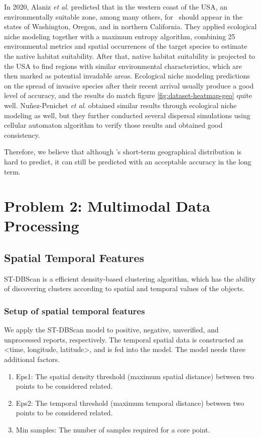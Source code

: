 \documentclass{mcmthesis}
\begin{document}
In 2020, Alaniz \emph{et al}. \cite{alaniz2021giants} predicted that in the western coast of the USA,
an environmentally suitable zone, among many others, for \VM\ should appear in the states of Washington, Oregon, and in northern California. They applied ecological niche modeling together with a maximum entropy
algorithm, combining 25 environmental metrics and spatial occurrences of the target species to estimate
the native habitat suitability. After that, native habitat suitability is projected to the USA to find regions with similar environmental characteristics, which are then marked as potential invadable areas. Ecological niche modeling predictions on the spread of invasive species after their recent arrival usually produce a good level of accuracy\cite{peterson2012species,elith2010art}, and the results do match figure \autoref{fig:dataset-heatmap-geo} quite well. Nuñez-Penichet \emph{et al}. \cite{nunez2021geo} obtained similar results through ecological niche modeling as well, but they further conducted several dispersal simulations using cellular automaton algorithm to verify those results and obtained good consistency.

Therefore, we believe that although \VM's short-term geographical distribution is hard to predict, it can still be predicted with an acceptable accuracy in the long term.


\section{Problem 2: Multimodal Data Processing}
\subsection{Spatial Temporal Features}
ST-DBScan\cite{STDBScan} is a efficient density-based clustering algorithm, which has the ability of discovering clusters according to spatial and temporal values of the objects.
\subsubsection{Setup of spatial temporal features}

We apply the ST-DBScan model to positive, negative,  unverified, and unprocessed reports, respectively. The temporal spatial data is constructed as <time, longitude, latitude>, and is fed into the model. The model needs three additional factors.

\begin{enumerate}
\item Eps1: The spatial density threshold (maximum spatial distance) between two points to be considered related. 
\item Eps2: The temporal threshold (maximum temporal distance) between two points to be considered related.
\item Min samples: The number of samples required for a core point.
\end{enumerate}
\end{document}

